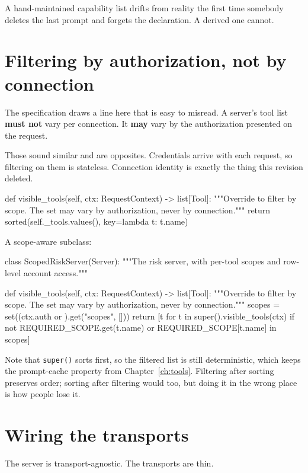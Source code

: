 A hand-maintained capability list drifts from reality the first time somebody
deletes the last prompt and forgets the declaration. A derived one cannot.

\section{Filtering by authorization, not by connection}

The specification draws a line here that is easy to misread. A server's tool list
\textbf{must not} vary per connection. It \textbf{may} vary by the authorization
presented on the request.

Those sound similar and are opposites. Credentials arrive with each request, so
filtering on them is stateless. Connection identity is exactly the thing this
revision deleted.

\begin{py}
def visible_tools(self, ctx: RequestContext) -> list[Tool]:
    """Override to filter by scope. The set may vary by authorization,
    never by connection."""
    return sorted(self._tools.values(), key=lambda t: t.name)
\end{py}

A scope-aware subclass:

\begin{py}
class ScopedRiskServer(Server):
    """The risk server, with per-tool scopes and row-level account access."""

    def visible_tools(self, ctx: RequestContext) -> list[Tool]:
        """Override to filter by scope. The set may vary by authorization,
        never by connection."""
        scopes = set((ctx.auth or {}).get("scopes", []))
        return [t for t in super().visible_tools(ctx)
                if not REQUIRED_SCOPE.get(t.name)
                or REQUIRED_SCOPE[t.name] in scopes]
\end{py}

Note that \texttt{super()} sorts first, so the filtered list is still
deterministic, which keeps the prompt-cache property from
Chapter~\ref{ch:tools}. Filtering after sorting preserves order; sorting after
filtering would too, but doing it in the wrong place is how people lose it.

\section{Wiring the transports}

The server is transport-agnostic. The transports are thin.

